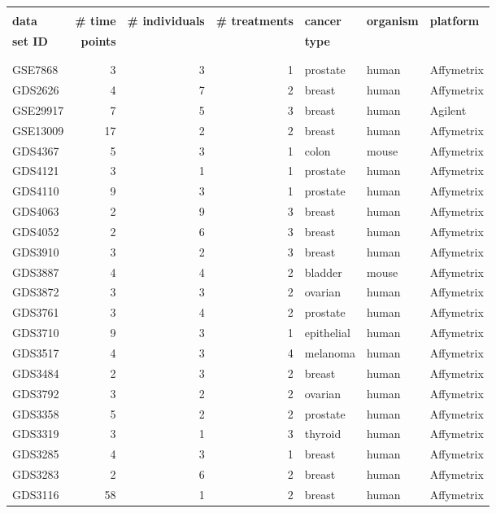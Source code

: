 \documentclass[a4paper]{article}
\begin{document}
\begin{table}
{\scriptsize
\begin{tabular}{lrrrlll}
\hline
& & & & & & \\
\textbf{data}	&	\textbf{\# time}	&	\textbf{\# individuals}	&	\textbf{\# treatments}	&	\textbf{cancer}	&	\textbf{organism}	&	\textbf{platform}	\\
\textbf{set ID}	&	\textbf{points}	&		&	&	\textbf{type}	&		& \\
& & & & & &
\\
\hline
& & & & & &
\\
GSE7868	&	3	&	3	&	1	&	prostate	&	human	&	Affymetrix	\\
GDS2626	&	4	&	7	&	2	&	breast	&	human	&	Affymetrix	\\
GSE29917	&	7	&	5	&	3	&	breast	&	human	&	Agilent	\\
GSE13009	&	17	&	2	&	2	&	breast	&	human	&	Affymetrix	\\
GDS4367	&	5	&	3	&	1	&	colon	&	mouse	&	Affymetrix	\\
GDS4121	&	3	&	1	&	1	&	prostate	&	human 	&	Affymetrix	\\
GDS4110	&	9	&	3	&	1	&	prostate	&	human	&	Affymetrix	\\
GDS4063	&	2	&	9	&	3	&	breast	&	human	&	Affymetrix	\\
GDS4052	&	2	&	6	&	3	&	breast	&	human	&	Affymetrix	\\
GDS3910	&	3	&	2	&	3	&	breast	&	human	&	Affymetrix	\\
GDS3887	&	4	&	4	&	2	&	bladder	&	mouse	&	Affymetrix	\\
GDS3872	&	3	&	3	&	2	&	ovarian	&	human	&	Affymetrix	\\
GDS3761	&	3	&	4	&	2	&	prostate	&	human	&	Affymetrix	\\
GDS3710	&	9	&	3	&	1	&	epithelial	&	human	&	Affymetrix	\\
GDS3517	&	4	&	3	&	4	&	melanoma	&	human	&	Affymetrix	\\
GDS3484	&	2	&	3	&	2	&	breast	&	human	&	Affymetrix	\\
GDS3792	&	3	&	2	&	2	&	ovarian	&	human	&	Affymetrix	\\
GDS3358	&	5	&	2	&	2	&	prostate	&	human	&	Affymetrix	\\
GDS3319	&	3	&	1	&	3	&	thyroid	&	human	&	Affymetrix	\\
GDS3285	&	4	&	3	&	1	&	breast	&	human 	&	Affymetrix	\\
GDS3283	&	2	&	6	&	2	&	breast	&	human	&	Affymetrix	\\
GDS3116	&	58	&	1	&	2	&	breast	&	human	&	Affymetrix	\\

\end{tabular}}
\end{table}
\end{document}
